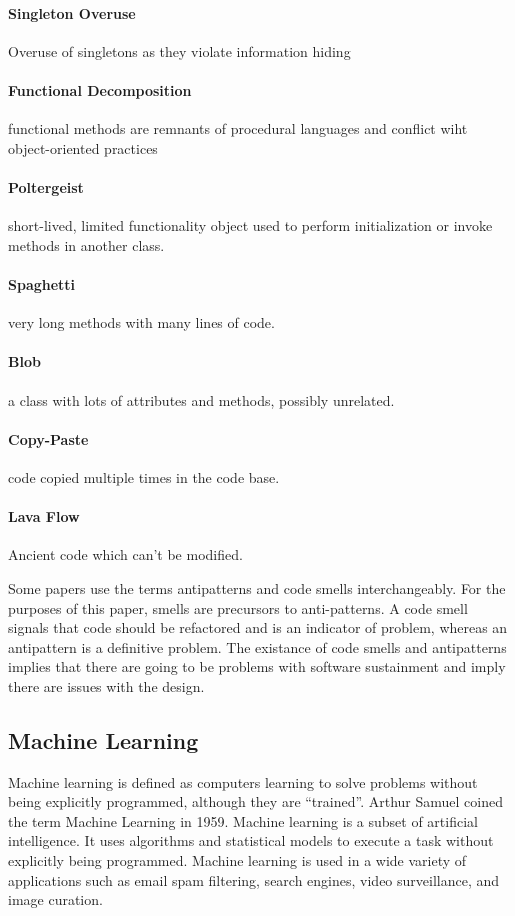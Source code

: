 \documentclass[conference]{IEEEtran}
\begin{document}
\paragraph{Singleton Overuse} Overuse of singletons as they violate information hiding
\paragraph{Functional Decomposition} functional methods are remnants of procedural languages and conflict wiht object-oriented practices
\paragraph{Poltergeist} short-lived, limited functionality object used to perform initialization or invoke methods in another class.
\paragraph{Spaghetti} very long methods with many lines of code.
\paragraph{Blob} a class with lots of attributes and methods, possibly unrelated.
\paragraph{Copy-Paste} code copied multiple times in the code base.
\paragraph{Lava Flow} Ancient code which can't be modified.

Some papers use the terms antipatterns and code smells interchangeably\cite{singh_systematic_2018}. 
For the purposes of this paper, smells are precursors to anti-patterns. 
A code smell signals that code should be refactored and is an indicator of problem, whereas an antipattern is a definitive problem. 
The existance of code smells and antipatterns implies that there are going to be problems with software sustainment and imply there are issues with the design.


\subsection{Machine Learning}
Machine learning is defined as computers learning to solve problems without being explicitly programmed, although they are ``trained''\cite{bishop_pattern_2006}. 
Arthur Samuel coined the term Machine Learning in 1959\cite{samuel_studies_1988}.
Machine learning is a subset of artificial intelligence. 
It uses algorithms and statistical models to execute a task without explicitly being programmed.
Machine learning is used in a wide variety of applications such as email spam filtering, search engines, video surveillance, and image curation.
\end{document}
